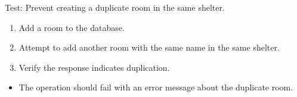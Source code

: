 \documentclass[letterpaper,10pt,english]{sphinxmanual}
\begin{document}
\begin{fulllineitems}
\label{\detokenize{test:test.test_room.test_create_room_duplicate}}
\pysigstartsignatures
\pysiglinewithargsret
{}
{}
{}
\pysigstopsignatures
\sphinxAtStartPar
Test: Prevent creating a duplicate room in the same shelter.
\begin{description}
\begin{enumerate}
%
\item {} 
\sphinxAtStartPar
Add a room to the database.

\item {} 
\sphinxAtStartPar
Attempt to add another room with the same name in the same shelter.

\item {} 
\sphinxAtStartPar
Verify the response indicates duplication.

\end{enumerate}

\begin{itemize}
\item {} 
\sphinxAtStartPar
The operation should fail with an error message about the duplicate room.

\end{itemize}

\end{description}

\end{fulllineitems}

\end{document}
